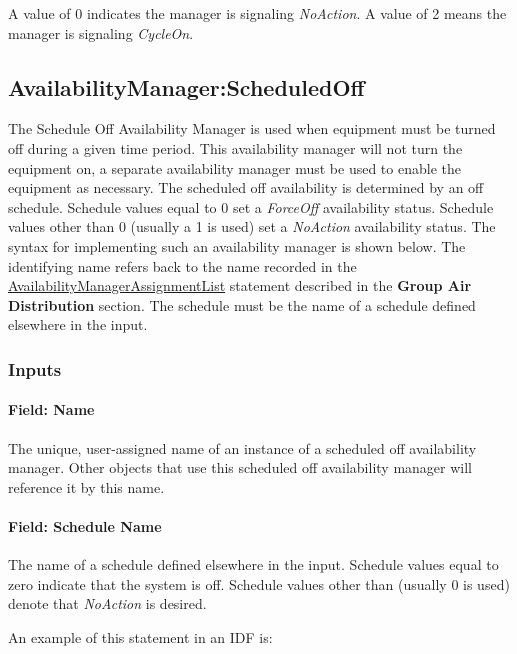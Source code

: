 A value of 0 indicates the manager is signaling \emph{NoAction}. A value of 2 means the manager is signaling \emph{CycleOn}.

\subsection{AvailabilityManager:ScheduledOff}\label{availabilitymanagerscheduledoff}

The Schedule Off Availability Manager is used when equipment must be turned off during a given time period. This availability manager will not turn the equipment on, a separate availability manager must be used to enable the equipment as necessary. The scheduled off availability is determined by an off schedule. Schedule values equal to 0 set a \emph{ForceOff} availability status. Schedule values other than 0 (usually a 1 is used) set a \emph{NoAction} availability status. The syntax for implementing such an availability manager is shown below. The identifying name refers back to the name recorded in the \hyperref[availabilitymanagerassignmentlist]{AvailabilityManagerAssignmentList} statement described in the \textbf{Group Air Distribution} section. The schedule must be the name of a schedule defined elsewhere in the input.

\subsubsection{Inputs}\label{inputs-2-041}

\paragraph{Field: Name}\label{field-name-2-038}

The unique, user-assigned name of an instance of a scheduled off availability manager. Other objects that use this scheduled off availability manager will reference it by this name.

\paragraph{Field: Schedule Name}\label{field-schedule-name-2-003}

The name of a schedule defined elsewhere in the input. Schedule values equal to zero indicate that the system is off. Schedule values other than (usually 0 is used) denote that \emph{NoAction} is desired.

An example of this statement in an IDF is:

